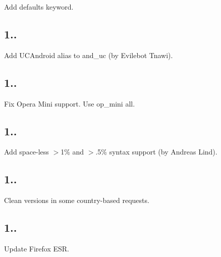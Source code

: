\begin{DoxyItemize}
\item Add {\ttfamily defaults} keyword.
\end{DoxyItemize}

\subsection*{1..}


\begin{DoxyItemize}
\item Add {\ttfamily U\+C\+Android} alias to {\ttfamily and\+\_\+uc} (by Evilebot Tnawi).
\end{DoxyItemize}

\subsection*{1..}


\begin{DoxyItemize}
\item Fix Opera Mini support. Use {\ttfamily op\+\_\+mini all}.
\end{DoxyItemize}

\subsection*{1..}


\begin{DoxyItemize}
\item Add space-\/less {\ttfamily $>$1\%} and {\ttfamily $>$.5\%} syntax support (by Andreas Lind).
\end{DoxyItemize}

\subsection*{1..}


\begin{DoxyItemize}
\item Clean {} versions in some country-\/based requests.
\end{DoxyItemize}

\subsection*{1..}


\begin{DoxyItemize}
\item Update Firefox E\+SR.
\end{DoxyItemize}

